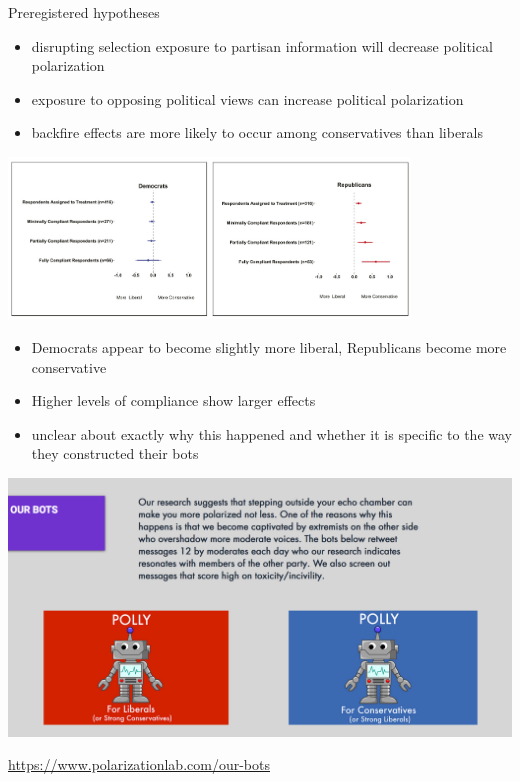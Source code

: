 \documentclass[aspectratio=169]{beamer}
\begin{document}
\begin{frame}

Preregistered hypotheses
\begin{itemize}
\item disrupting selection exposure to partisan information will decrease political polarization \pause
\item exposure to opposing political views can increase political polarization \pause
\item backfire effects are more likely to occur among conservatives than liberals
\end{itemize}

\end{frame}
\begin{frame}

\begin{center}
\includegraphics[width=0.8\textwidth]{figures/bail_exposure_2018_fig3}
\end{center}
\pause
\begin{itemize}
\item Democrats appear to become slightly more liberal, Republicans become more conservative \pause
\item Higher levels of compliance show larger effects\pause
\item unclear about exactly why this happened and whether it is specific to the way they constructed their bots
\end{itemize}

\end{frame}
\begin{frame}

\begin{center}
\includegraphics[width=\textwidth]{figures/polarization_lab_our_bots}
\end{center}

\vfill
\url{https://www.polarizationlab.com/our-bots}

\end{frame}
\end{document}
